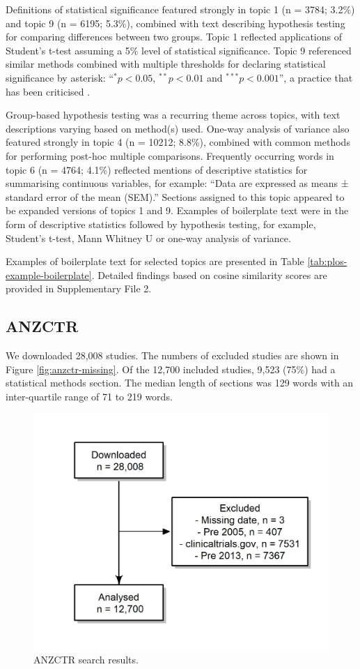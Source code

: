 \documentclass[12pt]{article}
\begin{document}
Definitions of statistical significance featured strongly in topic 1 (n
= 3784; 3.2\%) and topic 9 (n = 6195; 5.3\%), combined with text
describing hypothesis testing for comparing differences between two
groups. Topic 1 reflected applications of Student's t-test assuming a
5\% level of statistical significance. Topic 9 referenced similar
methods combined with multiple thresholds for declaring statistical
significance by asterisk: ``\(^{*}p<0.05\), \(^{**}p<0.01\) and
\(^{***}p<0.001\)'', a practice that has been criticised
\citep{Wasserstein2019}.

Group-based hypothesis testing was a recurring theme across topics, with
text descriptions varying based on method(s) used. One-way analysis of
variance also featured strongly in topic 4 (n = 10212; 8.8\%), combined
with common methods for performing post-hoc multiple comparisons.
Frequently occurring words in topic 6 (n = 4764; 4.1\%) reflected
mentions of descriptive statistics for summarising continuous variables,
for example: ``Data are expressed as means ± standard error of the mean
(SEM).'' Sections assigned to this topic appeared to be expanded
versions of topics 1 and 9. Examples of boilerplate text were in the
form of descriptive statistics followed by hypothesis testing, for
example, Student's t-test, Mann Whitney U or one-way analysis of
variance.

Examples of boilerplate text for selected topics are presented in Table
\ref{tab:plos-example-boilerplate}. Detailed findings based on cosine
similarity scores are provided in Supplementary File 2.

\subsection{ANZCTR}

We downloaded 28,008 studies. The numbers of excluded studies are shown
in Figure \ref{fig:anzctr-missing}. Of the 12,700 included studies,
9,523 (75\%) had a statistical methods section. The median length of
sections was 129 words with an inter-quartile range of 71 to 219 words.

\begin{figure}

{\centering \includegraphics[width=0.7\linewidth]{figures/excluded_anzctr_missing} 

}

\caption{\label{fig:anzctr-missing}ANZCTR search results.}\label{fig:unnamed-chunk-7}
\end{figure}
\end{document}
